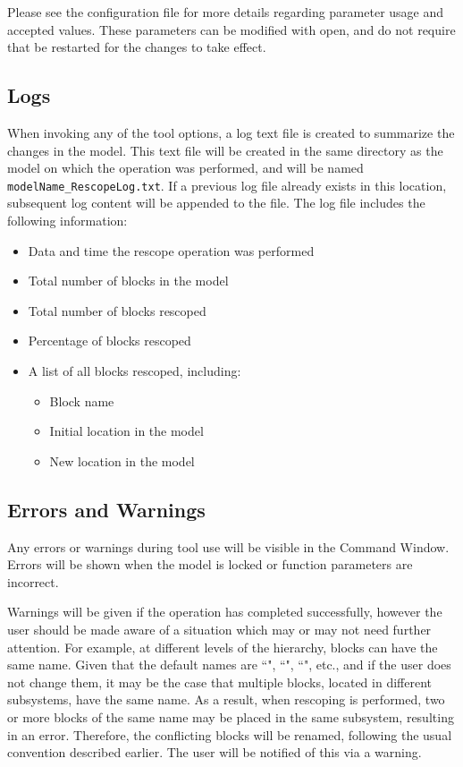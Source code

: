 \documentclass{article}
\begin{document}
Please see the configuration file for more details regarding parameter usage and accepted values. These parameters can be modified with \matlab open, and do not require that \matlab be restarted for the changes to take effect.

\subsection{Logs}
When invoking any of the tool options, a log text file is created to summarize the changes in the model. This text file will be created in the same directory as the model on which the operation was performed, and will be named \texttt{modelName\_RescopeLog.txt}. If a previous log file already exists in this location, subsequent log content will be appended to the file. The log file includes the following information:

\begin{itemize}
	\item Data and time the rescope operation was performed
	\item Total number of \DSM blocks in the model
	\item Total number of \DSM blocks rescoped
	\item Percentage of \DSM blocks rescoped
	\item A list of all \DSM blocks rescoped, including:
	\begin{itemize}
		\item Block name
		\item Initial location in the model
		\item New location in the model
	\end{itemize}
\end{itemize}

\subsection{Errors and Warnings}
Any errors or warnings during tool use will be visible in the \matlab Command Window. Errors will be shown when the model is locked or function parameters are incorrect.  

Warnings will be given if the operation has completed successfully, however the user should be made aware of a situation which may or may not need further attention. For example, at different levels of the hierarchy, \DSM blocks can have the same name. Given that the default names  are ``", ``", ``", etc., and if the user does not change them, it may be the case that multiple \DSM blocks, located in different subsystems, have the same name. As a result, when rescoping is performed, two or more \DSM blocks of the same name may be placed in the same subsystem, resulting in an error. Therefore, the conflicting blocks will be renamed, following the usual \Simulink convention described earlier. The user will be notified of this via a warning.
\end{document}
